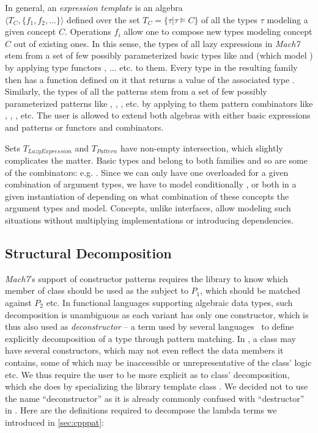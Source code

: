 In general, an \emph{expression template} is an algebra \\ $\langle T_C,\{f_1,f_2,...\}\rangle$ 
defined over the set $T_C = \{\tau | \tau \models C\}$ of all the types $\tau$ 
modeling a given concept $C$. Operations $f_i$ allow one to compose new types  
modeling concept $C$ out of existing ones. In this sense, the types of all lazy 
expressions in \emph{Mach7} stem from a set of few possibly parameterized basic 
types like  and  (which model ) 
by applying type functors ,  ... etc. to them. Every type 
in the resulting family then has a function  defined on it that 
returns a value of the associated type . Similarly, the types 
of all the patterns stem from a set of few possibly parameterized patterns like 
, , ,  etc. by applying to 
them pattern combinators like , , 
,  etc. The user is allowed to extend both 
algebras with either basic expressions and patterns or functors and combinators. 

Sets $T_{LazyExpression}$ and $T_{Pattern}$ have non-empty intersection, which 
slightly complicates the matter. Basic types  and  
belong to both families and so are some of the combinators: e.g. 
. Since we can only have one overloaded  for 
a given combination of argument types, we have to model conditionally
,  or both in a given instantiation of 
 depending on what combination of these concepts the 
argument types  and  model. Concepts, unlike interfaces, allow 
modeling such situations without multiplying implementations or introducing 
dependencies.

\subsection{Structural Decomposition}
\label{sec:bnd}

\emph{Mach7}'s support of constructor patterns  requires the 
library to know which member of class  should be used as the subject to 
$P_1$, which should be matched against $P_2$ etc. In functional languages 
supporting algebraic data types, such decomposition is unambiguous as each 
variant has only one constructor, which is thus also used as \emph{deconstructor}
-- a term used by several languages~\cite{padl08,Thorn2012} to define explicitly
decomposition of a type through pattern matching. In \Cpp{}, a class may have 
several constructors, which may not even reflect the data members it contains, 
some of which may be inaccessible or unrepresentative of the class' logic etc. 
We thus require the user to be more explicit as to class' decomposition, which 
she does by specializing the library template class . We decided 
not to use the name ``deconstructor'' as it is already commonly confused with 
``destructor'' in \Cpp{}. Here are the definitions required to decompose the 
lambda terms we introduced in \textsection\ref{sec:cpppat}:

